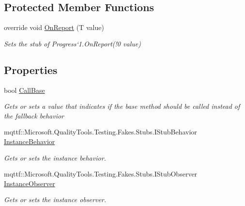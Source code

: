 \subsection*{Protected Member Functions}
\begin{DoxyCompactItemize}
\item 
override void \hyperlink{class_system_1_1_fakes_1_1_stub_progress_3_01_t_01_4_ae49f1a41e8bc89caa25c382498e8b7dd}{On\-Report} (T value)
\begin{DoxyCompactList}\small\item\em Sets the stub of Progress`1.On\-Report(!0 value)\end{DoxyCompactList}\end{DoxyCompactItemize}
\subsection*{Properties}
\begin{DoxyCompactItemize}
\item 
bool \hyperlink{class_system_1_1_fakes_1_1_stub_progress_3_01_t_01_4_a954441372f53825d156fc5c1a057ee11}{Call\-Base}
\begin{DoxyCompactList}\small\item\em Gets or sets a value that indicates if the base method should be called instead of the fallback behavior\end{DoxyCompactList}\item 
mqttf\-::\-Microsoft.\-Quality\-Tools.\-Testing.\-Fakes.\-Stubs.\-I\-Stub\-Behavior \hyperlink{class_system_1_1_fakes_1_1_stub_progress_3_01_t_01_4_ae5145862429921ed110ed1d85dfc69dd}{Instance\-Behavior}
\begin{DoxyCompactList}\small\item\em Gets or sets the instance behavior.\end{DoxyCompactList}\item 
mqttf\-::\-Microsoft.\-Quality\-Tools.\-Testing.\-Fakes.\-Stubs.\-I\-Stub\-Observer \hyperlink{class_system_1_1_fakes_1_1_stub_progress_3_01_t_01_4_a3824ad5b60eeb65c854b22c53dbc2469}{Instance\-Observer}
\begin{DoxyCompactList}\small\item\em Gets or sets the instance observer.\end{DoxyCompactList}\end{DoxyCompactItemize}


